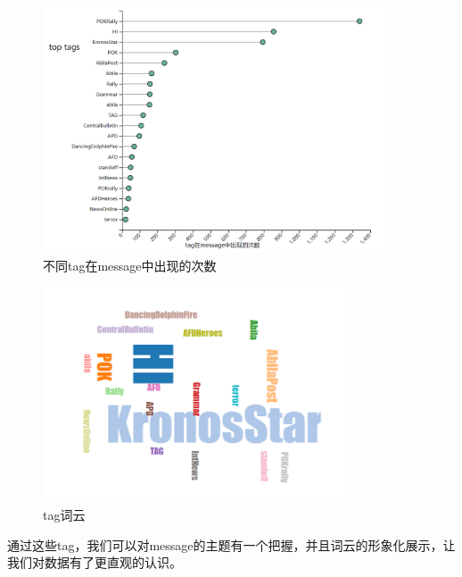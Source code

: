 \documentclass[a4paper]{article}
\begin{document}
\begin{figure}[H]
  \centering
  \includegraphics[width=0.9\textwidth]{images/1-tags.png}
  \caption{不同tag在message中出现的次数}\label{fig:1-tags}
  \vspace{\baselineskip}
\end{figure}
\begin{figure}[H]
  \centering
  \includegraphics[width=0.8\textwidth]{images/1-wordcloud.png}
  \caption{tag词云}\label{fig:1-wordcloud}
  \vspace{\baselineskip}
\end{figure}
通过这些tag，我们可以对message的主题有一个把握，并且词云的形象化展示，让我们对数据有了更直观的认识。
\end{document}
